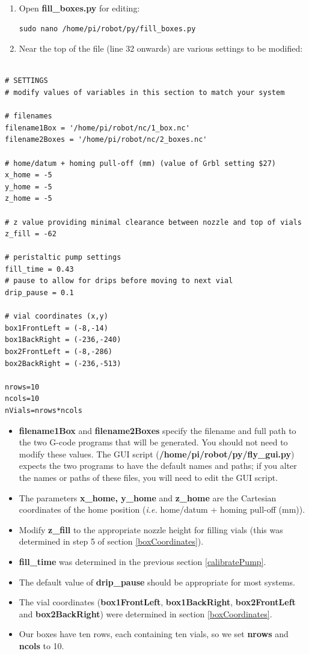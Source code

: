 \documentclass[]{book}
\providecommand{\tightlist}{%
  \setlength{\itemsep}{0pt}\setlength{\parskip}{0pt}}
\theoremstyle{definition}
\theoremstyle{definition}
\theoremstyle{remark}
\begin{document}
\begin{enumerate}
\def\labelenumi{\arabic{enumi}.}
\item
  Open \textbf{fill\_boxes.py} for editing:

\begin{verbatim}
sudo nano /home/pi/robot/py/fill_boxes.py
\end{verbatim}
\item
  Near the top of the file (line 32 onwards) are various settings to be
  modified:
\end{enumerate}

\begin{verbatim}

# SETTINGS
# modify values of variables in this section to match your system

# filenames
filename1Box = '/home/pi/robot/nc/1_box.nc'
filename2Boxes = '/home/pi/robot/nc/2_boxes.nc'

# home/datum + homing pull-off (mm) (value of Grbl setting $27)
x_home = -5
y_home = -5
z_home = -5

# z value providing minimal clearance between nozzle and top of vials
z_fill = -62 

# peristaltic pump settings
fill_time = 0.43
# pause to allow for drips before moving to next vial
drip_pause = 0.1 

# vial coordinates (x,y)
box1FrontLeft = (-8,-14)
box1BackRight = (-236,-240)
box2FrontLeft = (-8,-286)
box2BackRight = (-236,-513)

nrows=10
ncols=10
nVials=nrows*ncols
\end{verbatim}

\begin{itemize}
\tightlist
\item
  \textbf{filename1Box} and \textbf{filename2Boxes} specify the filename
  and full path to the two G-code programs that will be generated. You
  should not need to modify these values. The GUI script
  (\textbf{/home/pi/robot/py/fly\_gui.py}) expects the two programs to
  have the default names and paths; if you alter the names or paths of
  these files, you will need to edit the GUI script.
\item
  The parameters \textbf{x\_home, y\_home} and \textbf{z\_home} are the
  Cartesian coordinates of the home position (\emph{i.e.} home/datum +
  homing pull-off (mm)).
\item
  Modify \textbf{z\_fill} to the appropriate nozzle height for filling
  vials (this was determined in step 5 of section \ref{boxCoordinates}).
\item
  \textbf{fill\_time} was determined in the previous section
  \ref{calibratePump}.
\item
  The default value of \textbf{drip\_pause} should be appropriate for
  most systems.
\item
  The vial coordinates (\textbf{box1FrontLeft}, \textbf{box1BackRight},
  \textbf{box2FrontLeft} and \textbf{box2BackRight}) were determined in
  section \ref{boxCoordinates}.
\item
  Our boxes have ten rows, each containing ten vials, so we set
  \textbf{nrows} and \textbf{ncols} to 10.
\end{itemize}
\end{document}
